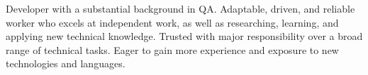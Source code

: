 

\begin{cvparagraph}

Developer with a substantial background in QA. Adaptable, driven, and reliable worker who excels at independent work, as well as researching, learning, and applying new technical knowledge. Trusted with major responsibility over a broad range of technical tasks. Eager to gain more experience and exposure to new technologies and languages.
\end{cvparagraph}
